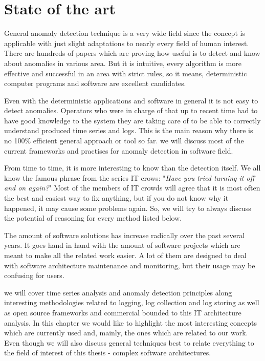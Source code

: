 \chapter{State of the art}
\label{chap:stateOfTheArt}

General anomaly detection technique is a very wide field since the concept is applicable with just slight adaptations to nearly every field of human interest. There are hundreds of papers which are proving how useful is to detect and know about anomalies in various area. But it is intuitive, every algorithm is more effective and successful in an area with strict rules, so it means, deterministic computer programs and software  are excellent candidates.

Even with the deterministic  applications and software in general it is not easy to detect anomalies. Operators who were in charge of that up to recent time had to have good knowledge to the system they are taking care of to be able to correctly understand produced time series and logs. This is the main reason why there is no 100\% efficient general approach or tool so far.   we will discuss most of the current frameworks and practises for anomaly detection in software field.

From time to time, it is more interesting to know  than the detection itself. We all know the famous phrase from the series IT crows: "\textit{Have you tried turning it off and on again?}" Most of the members of IT crowds will agree that it is most often the best and easiest way to fix anything, but if you do not know why it happened, it may cause some problems again. So, we will try to always discuss the potential of reasoning for every method listed below.

The amount of software solutions has increase radically over the past several years. It goes hand in hand with the amount of software projects which are meant to make all the related work easier. A lot of them are designed to deal with software architecture maintenance and monitoring, but their usage may be confusing for users.

 we will cover time series analysis and anomaly detection principles along interesting methodologies related to logging, log collection and log storing as well as open source frameworks and commercial bounded to this IT architecture analysis. In this chapter we would like to highlight the most interesting concepts which are currently used and, mainly, the ones which are related to our  work. Even though we will also discuss general techniques  best to relate everything to the field of interest of this thesis - complex software architectures.

